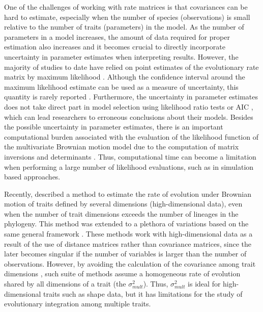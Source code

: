 One of the challenges of working with rate matrices is that covariances can be hard to estimate, especially when the number of species (observations) is small relative to the number of traits (parameters) in the model. As the number of parameters in a model increases, the amount of data required for proper estimation also increases and it becomes crucial to directly incorporate uncertainty in parameter estimates when interpreting results. However, the majority of studies to date have relied on point estimates of the evolutionary rate matrix by maximum likelihood \citep[][but see \citealp{huelsenbeck_detecting_2003} and \citealp{dines_sexual_2014} for exceptions]{revell_testing_2008, revell_phylogenetic_2009, Clavel_mvmorph, goolsby_pseudolik_2016}. Although the confidence interval around the maximum likelihood estimate can be used as a measure of uncertainty, this quantity is rarely reported \citep{revell_testing_2008, revell_phylogenetic_2009, adams_comparing_2012, immler_distinct_2012, adams_assessing_2014, collar_biting_2014}. Furthermore, the uncertainty in parameter estimates does not take direct part in model selection using likelihood ratio tests or AIC \citep{burnham_model_2003}, which can lead researchers to erroneous conclusions about their models. Besides the possible uncertainty in parameter estimates, there is an important computational burden associated with the evaluation of the likelihood function of the multivariate Brownian motion model due to the computation of matrix inversions and determinants \citep{felsenstein_1973, hadfield_general_2010, freckleton_fast_2012}. Thus, computational time can become a limitation when performing a large number of likelihood evaluations, such as in simulation based approaches.

Recently, \citet{adams_quantifying_2014} described a method to estimate the rate of evolution under Brownian motion of traits defined by several dimensions (high-dimensional data), even when the number of trait dimensions exceeds the number of lineages in the phylogeny. This method was extended to a plethora of variations based on the same general framework \citep[][see also \citet{goolsby_pseudolik_2016} for a different implementation]{adams_assessing_2014, adams_generalized_2014, denton_new_2015}. These methods work with high-dimensional data as a result of the use of distance matrices rather than covariance matrices, since the later becomes singular if the number of variables is larger than the number of observations. However, by avoiding the calculation of the covariance among trait dimensions \citep{adams_quantifying_2014}, such suite of methods assume a homogeneous rate of evolution shared by all dimensions of a trait (the $\sigma^{2}_{mult}$). Thus, $\sigma^{2}_{mult}$ is ideal for high-dimensional traits such as shape data, but it has limitations for the study of evolutionary integration among multiple traits.


